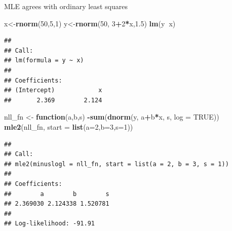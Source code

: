 \documentclass[
  ignorenonframetext,
]{beamer}
\newenvironment{Shaded}{\begin{snugshade}}{\end{snugshade}}
\newcommand{\ControlFlowTok}[1]{\textcolor[rgb]{0.13,0.29,0.53}{\textbf{#1}}}
\newcommand{\DataTypeTok}[1]{\textcolor[rgb]{0.13,0.29,0.53}{#1}}
\newcommand{\DecValTok}[1]{\textcolor[rgb]{0.00,0.00,0.81}{#1}}
\newcommand{\FloatTok}[1]{\textcolor[rgb]{0.00,0.00,0.81}{#1}}
\newcommand{\KeywordTok}[1]{\textcolor[rgb]{0.13,0.29,0.53}{\textbf{#1}}}
\newcommand{\NormalTok}[1]{#1}
\newcommand{\OperatorTok}[1]{\textcolor[rgb]{0.81,0.36,0.00}{\textbf{#1}}}
\newcommand{\OtherTok}[1]{\textcolor[rgb]{0.56,0.35,0.01}{#1}}
\newcommand{\StringTok}[1]{\textcolor[rgb]{0.31,0.60,0.02}{#1}}
\begin{document}
\begin{frame}[fragile]{MLE agrees with ordinary least squares}
\protect\hypertarget{mle-agrees-with-ordinary-least-squares}{}

\scriptsize

\begin{Shaded}
\begin{Highlighting}[]
\NormalTok{x<-}\KeywordTok{rnorm}\NormalTok{(}\DecValTok{50}\NormalTok{,}\DecValTok{5}\NormalTok{,}\DecValTok{1}\NormalTok{)}
\NormalTok{y<-}\KeywordTok{rnorm}\NormalTok{(}\DecValTok{50}\NormalTok{, }\DecValTok{3}\OperatorTok{+}\DecValTok{2}\OperatorTok{*}\NormalTok{x,}\FloatTok{1.5}\NormalTok{)}
\KeywordTok{lm}\NormalTok{(y}\OperatorTok{~}\NormalTok{x)}
\end{Highlighting}
\end{Shaded}

\begin{verbatim}
## 
## Call:
## lm(formula = y ~ x)
## 
## Coefficients:
## (Intercept)            x  
##       2.369        2.124
\end{verbatim}

\begin{Shaded}
\begin{Highlighting}[]
\NormalTok{nll_fn <-}\StringTok{ }\ControlFlowTok{function}\NormalTok{(a,b,s) }\OperatorTok{-}\KeywordTok{sum}\NormalTok{(}\KeywordTok{dnorm}\NormalTok{(y, a}\OperatorTok{+}\NormalTok{b}\OperatorTok{*}\NormalTok{x, s, }\DataTypeTok{log =} \OtherTok{TRUE}\NormalTok{))}
\KeywordTok{mle2}\NormalTok{(nll_fn, }\DataTypeTok{start =} \KeywordTok{list}\NormalTok{(}\DataTypeTok{a=}\DecValTok{2}\NormalTok{,}\DataTypeTok{b=}\DecValTok{3}\NormalTok{,}\DataTypeTok{s=}\DecValTok{1}\NormalTok{))}
\end{Highlighting}
\end{Shaded}

\begin{verbatim}
## 
## Call:
## mle2(minuslogl = nll_fn, start = list(a = 2, b = 3, s = 1))
## 
## Coefficients:
##        a        b        s 
## 2.369030 2.124338 1.520781 
## 
## Log-likelihood: -91.91
\end{verbatim}

\end{frame}
\end{document}
